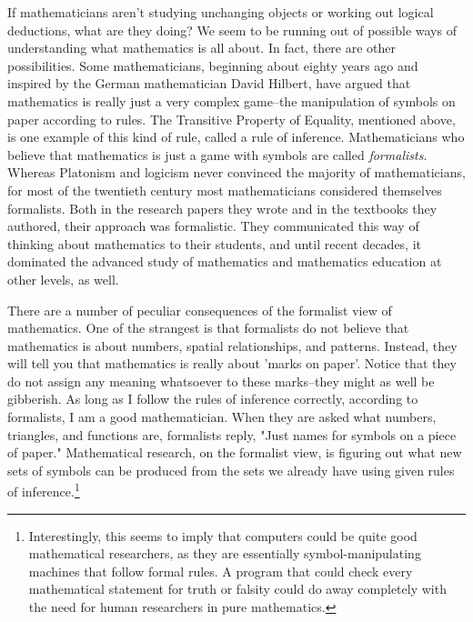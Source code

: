     If mathematicians aren't studying unchanging objects or working out logical deductions, what are they doing?  We seem to be running out of possible ways of understanding what mathematics is all about.  In fact, there are other possibilities.  Some mathematicians, beginning about eighty years ago and inspired by the German mathematician David Hilbert, have argued that mathematics is really just a very complex game--the manipulation of symbols on paper according to rules.  The Transitive Property of Equality, mentioned above, is one example of this kind of rule, called a rule of inference.  Mathematicians who believe that mathematics is just a game with symbols are called \emph{formalists}.  Whereas Platonism and logicism never convinced the majority of mathematicians, for most of the twentieth century most mathematicians considered themselves formalists.  Both in the research papers they wrote and in the textbooks they authored, their approach was formalistic.  They communicated this way of thinking about mathematics to their students, and until recent decades, it dominated the advanced study of mathematics and mathematics education at other levels, as well.
     
     There are a number of peculiar consequences of the formalist view of mathematics.  One of the strangest is that formalists do not believe that mathematics is about numbers, spatial relationships, and patterns.  Instead, they will tell you that mathematics is really about 'marks on paper'.  Notice that they do not assign any meaning whatsoever to these marks--they might as well be gibberish.  As long as I follow the rules of inference correctly, according to formalists, I am a good mathematician.  When they are asked what numbers, triangles, and functions are, formalists reply, "Just names for symbols on a piece of paper."   Mathematical research, on the formalist view, is figuring out what new sets of symbols can be produced from the sets we already have using given rules of inference.\footnote{Interestingly, this seems to imply that computers could be quite good mathematical researchers, as they are essentially symbol-manipulating machines that follow formal rules.  A program that could check every mathematical statement for truth or falsity could do away completely with the need for human researchers in pure mathematics.}
     
